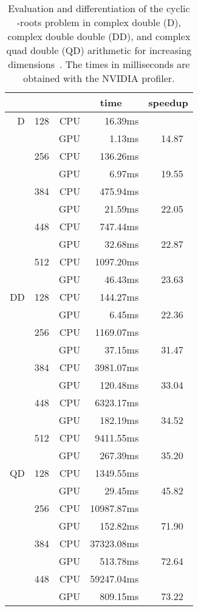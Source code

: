\documentclass{article}
\begin{document}
\begin{table}[h]
\begin{center}
\caption{Evaluation and differentiation of the cyclic -roots problem
in complex double (D), complex double double (DD), 
and complex quad double (QD) arithmetic for increasing dimensions~.
The times in milliseconds are obtained with the NVIDIA profiler.}
\label{tabcyclicevaldiff}
\begin{tabular}{rrr|r|r}
   &  &     &    time~~~ & speedup \\ \hline
D  & 128 & CPU &    16.39ms &        \\
   &     & GPU &     1.13ms & 14.87~ \\
   & 256 & CPU &   136.26ms &        \\
   &     & GPU &     6.97ms & 19.55~ \\ 
   & 384 & CPU &   475.94ms &        \\
   &     & GPU &    21.59ms & 22.05~ \\
   & 448 & CPU &   747.44ms &        \\
   &     & GPU &    32.68ms & 22.87~ \\
   & 512 & CPU &  1097.20ms &        \\
   &     & GPU &    46.43ms & 23.63~ \\ \hline
DD & 128 & CPU &   144.27ms &        \\
   &     & GPU &     6.45ms & 22.36~ \\
   & 256 & CPU &  1169.07ms &        \\
   &     & GPU &    37.15ms & 31.47~ \\
   & 384 & CPU &  3981.07ms &        \\
   &     & GPU &   120.48ms & 33.04~ \\
   & 448 & CPU &  6323.17ms &        \\
   &     & GPU &   182.19ms & 34.52~ \\
   & 512 & CPU &  9411.55ms &        \\
   &     & GPU &   267.39ms & 35.20~ \\ \hline
QD & 128 & CPU &  1349.55ms &        \\
   &     & GPU &    29.45ms & 45.82~ \\
   & 256 & CPU & 10987.87ms &        \\
   &     & GPU &   152.82ms & 71.90~ \\
   & 384 & CPU & 37323.08ms &        \\
   &     & GPU &   513.78ms & 72.64~ \\
   & 448 & CPU & 59247.04ms &        \\
   &     & GPU &   809.15ms & 73.22~ \\
\end{tabular}
\end{center}
\end{table}
\end{document}
